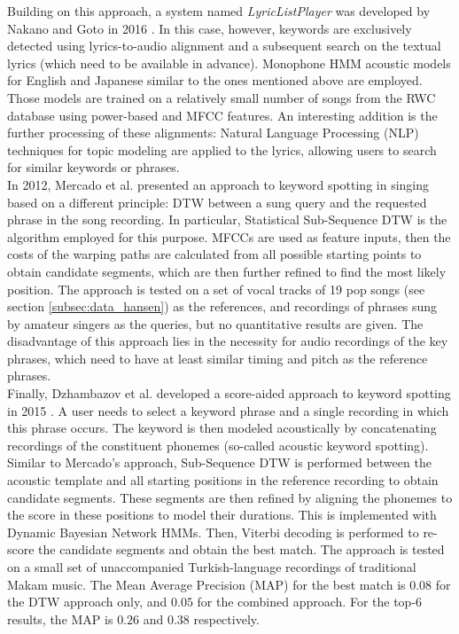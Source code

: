 Building on this approach, a system named \textit{LyricListPlayer} was developed by Nakano and Goto in 2016 \cite{lyriclistplayer}. In this case, however, keywords are exclusively detected using lyrics-to-audio alignment and a subsequent search on the textual lyrics (which need to be available in advance). Monophone HMM acoustic models for English and Japanese similar to the ones mentioned above are employed. Those models are trained on a relatively small number of songs from the RWC database \cite{rwc} using power-based and MFCC features. An interesting addition is the further processing of these alignments: Natural Language Processing (NLP) techniques for topic modeling are applied to the lyrics, allowing users to search for similar keywords or phrases.\\

In 2012, Mercado et al. presented an approach to keyword spotting in singing based on a different principle: DTW between a sung query and the requested phrase in the song recording. In particular, Statistical Sub-Sequence DTW is the algorithm employed for this purpose. MFCCs are used as feature inputs, then the costs of the warping paths are calculated from all possible starting points to obtain candidate segments, which are then further refined to find the most likely position.
The approach is tested on a set of vocal tracks of 19 pop songs (see section \ref{subsec:data_hansen}) as the references, and recordings of phrases sung by amateur singers as the queries, but no quantitative results are given. The disadvantage of this approach lies in the necessity for audio recordings of the key phrases, which need to have at least similar timing and pitch as the reference phrases.\\

Finally, Dzhambazov et al. developed a score-aided approach to keyword spotting in 2015 \cite{dzhambazov_ismir}. A user needs to select a keyword phrase and a single recording in which this phrase occurs. The keyword is then modeled acoustically by concatenating recordings of the constituent phonemes (so-called acoustic keyword spotting). Similar to Mercado's approach, Sub-Sequence DTW is performed between the acoustic template and all starting positions in the reference recording to obtain candidate segments. These segments are then refined by aligning the phonemes to the score in these positions to model their durations. This is implemented with Dynamic Bayesian Network HMMs. Then, Viterbi decoding is performed to re-score the candidate segments and obtain the best match.
The approach is tested on a small set of unaccompanied Turkish-language recordings of traditional Makam music. The Mean Average Precision (MAP) for the best match is $0.08$ for the DTW approach only, and $0.05$ for the combined approach. For the top-6 results, the MAP is $0.26$ and $0.38$ respectively.


